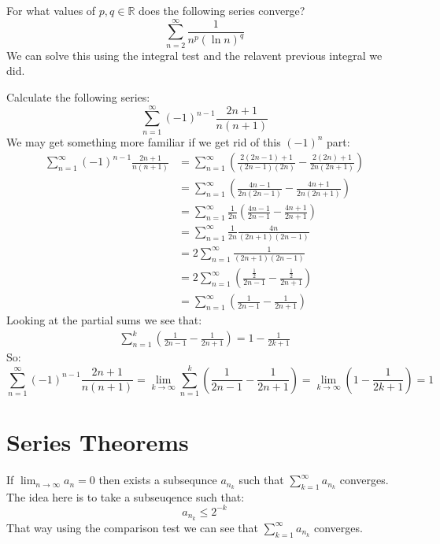 \documentclass{article}
\theoremstyle{plain}
\newcommand{\R}{\mathbb{R}}
\begin{document}
	\newpage
	
	For what values of $p,q\in\R$ does the following series 
	converge?
	\[
		\sum_{n=2}^{\infty}{\frac{1}{n^p(\ln n)^q}}
	\]
	We can solve this using the integral test and the relavent previous
	integral we did.
	
	\newpage
	
	Calculate the following series:
	\[
	\sum_{n=1}^{\infty}{(-1)^{n-1}\frac{2n+1}{n(n+1)}}
	\]
	We may get something more familiar if we get rid of this $(-1)^n$ part:
	\begin{align*}
		\sum_{n=1}^{\infty}{(-1)^{n-1}\frac{2n+1}{n(n+1)}} &= 
		\sum_{n=1}^{\infty}{\left(\frac{2(2n-1)+1}{(2n-1)(2n)} - 
		\frac{2(2n)+1}{2n(2n+1)}\right)} \\ &=
		\sum_{n=1}^{\infty}{\left(\frac{4n-1}{2n(2n-1)} - 
		\frac{4n+1}{2n(2n+1)}\right)} \\ &=
		\sum_{n=1}^{\infty}{\frac{1}{2n}\left(\frac{4n-1}{2n-1} - 
		\frac{4n+1}{2n+1}\right)} \\ &=
		\sum_{n=1}^{\infty}{\frac{1}{2n}\frac{4n}{(2n+1)(2n-1)}} \\ &=
		2\sum_{n=1}^{\infty}{\frac{1}{(2n+1)(2n-1)}} \\ &=
		2\sum_{n=1}^{\infty}
		{\left(\frac{\frac{1}{2}}{2n-1} - \frac{\frac{1}{2}}{2n+1}\right)} 
		\\ &=
		\sum_{n=1}^{\infty}{\left(\frac{1}{2n-1} - \frac{1}{2n+1}\right)}
	\end{align*}
	Looking at the partial sums we see that:
	\begin{align*}
		\sum_{n=1}^{k}{\left(\frac{1}{2n-1} - \frac{1}{2n+1}\right)} =
		1 - \frac{1}{2k+1}
	\end{align*}
	So:
	\[
		\sum_{n=1}^{\infty}{(-1)^{n-1}\frac{2n+1}{n(n+1)}} = 
		\lim_{k\to\infty}
		{\sum_{n=1}^{k}{\left(\frac{1}{2n-1} - \frac{1}{2n+1}\right)}} = 
		\lim_{k\to\infty}{\left(1 - \frac{1}{2k+1}\right)} = 1
	\]
	
	\newpage
	
	\section{Series Theorems}
	If $\lim_{n\to\infty}{a_n} = 0$ then exists a subsequnce
	$a_{n_k}$ such that $\sum_{k=1}^{\infty}{a_{n_k}}$ converges.
	The idea here is to take a subseuqence such that:
	\[
		a_{n_k} \le 2^{-k}
	\]
	That way using the comparison test we can see that 
	$\sum_{k=1}^{\infty}{a_{n_k}}$ converges.
	
	\newpage
	
\end{document}
